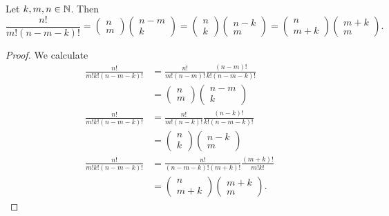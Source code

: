 \begin{lemma} \label{binomialCoefficientMultiplicationLemma}
Let $k,m,n\in \mathbb{N}$. Then
\[ \frac{n!}{m!(n-m-k)!} = \begin{pmatrix}
n \\ m
\end{pmatrix}\begin{pmatrix}
n-m \\ k
\end{pmatrix} = \begin{pmatrix}
n \\ k
\end{pmatrix}\begin{pmatrix}
n-k \\ m
\end{pmatrix} = \begin{pmatrix}
n \\ m+k
\end{pmatrix}\begin{pmatrix}
m+k \\ m
\end{pmatrix}. \]
\end{lemma}
\begin{proof}
We calculate
\begin{align*}
\frac{n!}{m!k!(n-m-k)!} &= \frac{n!}{m!(n-m)!}\frac{(n-m)!}{k!(n-m-k)!} \\
&= \begin{pmatrix}
n \\ m
\end{pmatrix}\begin{pmatrix}
n-m \\ k
\end{pmatrix} \\
\frac{n!}{m!k!(n-m-k)!} &= \frac{n!}{m!(n-k)!}\frac{(n-k)!}{k!(n-m-k)!} \\
&= \begin{pmatrix}
n \\ k
\end{pmatrix}\begin{pmatrix}
n-k \\ m
\end{pmatrix} \\
\frac{n!}{m!k!(n-m-k)!} &= \frac{n!}{(n-m-k)!(m+k)!}\frac{(m+k)!}{m!k!} \\
&= \begin{pmatrix}
n \\ m+k
\end{pmatrix}\begin{pmatrix}
m+k \\ m
\end{pmatrix}.
\end{align*}
\end{proof}

